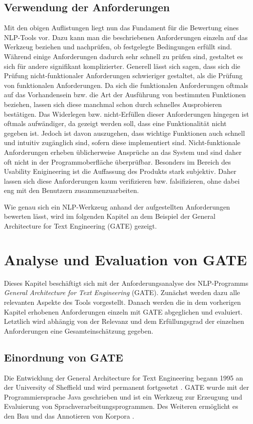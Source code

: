 \documentclass[12pt]{report}
\begin{document}
\section{Verwendung der Anforderungen}
Mit den obigen Auflistungen liegt nun das Fundament für die Bewertung eines NLP-Tools vor. Dazu kann man die beschriebenen Anforderungen einzeln auf das Werkzeug beziehen und nachprüfen, ob festgelegte Bedingungen erfüllt sind. Während einige Anforderungen dadurch sehr schnell zu prüfen sind, gestaltet es sich für andere signifikant komplizierter. Generell lässt sich sagen, dass sich die Prüfung nicht-funktionaler Anforderungen schwieriger gestaltet, als die Prüfung von funktionalen Anforderungen\cite{bal98}. Da sich die funktionalen Anforderungen oftmals auf das Vorhandensein bzw. die Art der Ausführung von bestimmten Funktionen beziehen, lassen sich diese manchmal schon durch schnelles Ausprobieren bestätigen. Das Widerlegen bzw. nicht-Erfüllen dieser Anforderungen hingegen ist oftmals aufwändiger, da gezeigt werden soll, dass eine Funktionalität nicht gegeben ist. Jedoch ist davon auszugehen, dass wichtige Funktionen auch schnell und intuitiv zugänglich sind, sofern diese implementiert sind. 
Nicht-funktionale Anforderungen erheben üblicherweise Ansprüche an das System und sind daher oft nicht in der Programmoberfläche überprüfbar. Besonders im Bereich des Usability Enigineering ist die Auffassung des Produkts stark subjektiv. Daher lassen sich diese Anforderungen kaum verifizieren bzw. falsifizieren, ohne dabei eng mit den Benutzern zusammenzuarbeiten. 

Wie genau sich ein NLP-Werkzeug anhand der aufgestellten Anforderungen bewerten lässt, wird im folgenden Kapitel an dem Beispiel der General Architecture for Text Engineering (GATE) gezeigt. 

\chapter{Analyse und Evaluation von GATE}
Dieses Kapitel beschäftigt sich mit der Anforderungsanalyse des NLP-Programms \textit{General Architecture for Text Engineering} (GATE). Zunächst werden dazu alle relevanten Aspekte des Tools vorgestellt. Danach werden die in dem vorherigen Kapitel erhobenen Anforderungen einzeln mit GATE abgeglichen und evaluiert. Letztlich wird abhängig von der Relevanz und dem Erfüllungsgrad der einzelnen Anforderungen eine Gesamteinschätzung gegeben.

\section{Einordnung von GATE}
Die Entwicklung der General Architecture for Text Engineering begann 1995 an der University of Sheffield und wird permanent fortgesetzt \cite{cgw95}. GATE wurde mit der Programmiersprache Java geschrieben  und ist ein Werkzeug zur Erzeugung und Evaluierung von Sprachverarbeitungsprogrammen. Des Weiteren ermöglicht es den Bau und das Annotieren von Korpora \cite{cmb02}. 
\end{document}
